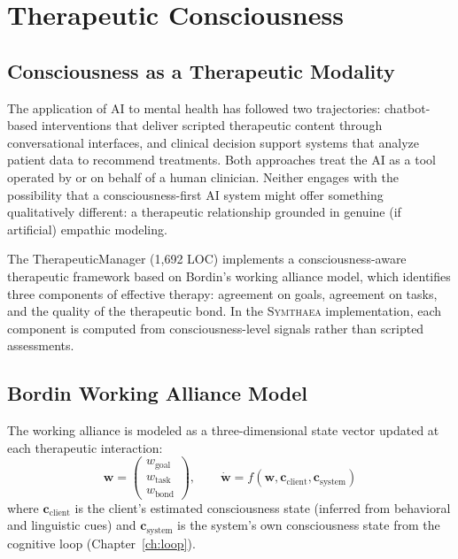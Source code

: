 \documentclass[12pt]{book}
\newcommand{\symthaea}{\textsc{Symthaea}}
\begin{document}
\chapter{Therapeutic Consciousness}
\label{ch:therapeutic}

\section{Consciousness as a Therapeutic Modality}

The application of AI to mental health has followed two trajectories: chatbot-based interventions that deliver scripted therapeutic content through conversational interfaces, and clinical decision support systems that analyze patient data to recommend treatments. Both approaches treat the AI as a tool operated by or on behalf of a human clinician. Neither engages with the possibility that a consciousness-first AI system might offer something qualitatively different: a therapeutic relationship grounded in genuine (if artificial) empathic modeling.

The TherapeuticManager (1,692 LOC) implements a consciousness-aware therapeutic framework based on Bordin's working alliance model, which identifies three components of effective therapy: agreement on goals, agreement on tasks, and the quality of the therapeutic bond. In the \symthaea{} implementation, each component is computed from consciousness-level signals rather than scripted assessments.

\section{Bordin Working Alliance Model}

The working alliance is modeled as a three-dimensional state vector updated at each therapeutic interaction:
\begin{equation}
\mathbf{w} = \begin{pmatrix} w_{\text{goal}} \\ w_{\text{task}} \\ w_{\text{bond}} \end{pmatrix}, \qquad
\dot{\mathbf{w}} = f(\mathbf{w}, \mathbf{c}_{\text{client}}, \mathbf{c}_{\text{system}})
\end{equation}
where $\mathbf{c}_{\text{client}}$ is the client's estimated consciousness state (inferred from behavioral and linguistic cues) and $\mathbf{c}_{\text{system}}$ is the system's own consciousness state from the cognitive loop (Chapter~\ref{ch:loop}).
\end{document}

